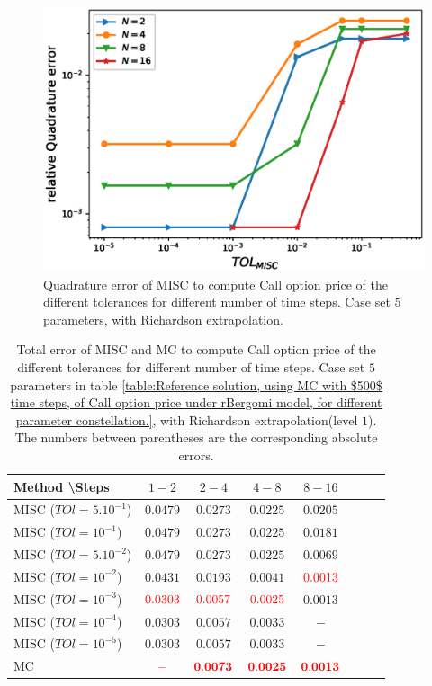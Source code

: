 \documentclass[11pt]{article}
\begin{document}
\begin{figure}[h!]
	\centering
	\includegraphics[width=0.7\linewidth]{./figures/rBergomi_MISC_quadratre_error/vs_TOL/set5/relative_quad_error_wrt_MISC_TOL_set5_with_rich}
	
	
	\caption{Quadrature error of MISC to compute Call option price of the different tolerances for different number of time steps. Case  set $5$ parameters, with Richardson extrapolation.}
	\label{fig:Quadrature_error_set5_rich}
\end{figure}

\begin{table}[h!]
	\centering
	\begin{tabular}{l*{6}{c}r}
		Method \textbackslash  Steps            & $1-2$ & $2-4$ & $4-8$ & $8-16$  \\
		\hline
		MISC ($TOl=5.10^{-1}$)  & $0.0479$ & $0.0273$  & $0.0225$ & $0.0205$  \\
		MISC ($TOl=10^{-1}$)   & $0.0479$  &$0.0273$  &$0.0225$ & $0.0181$  \\
		MISC ($TOl=5.10^{-2}$)  &  $0.0479$ & $0.0273$  &$0.0225$ & $0.0069$  \\
			MISC ($TOl=10^{-2}$)  &  $0.0431$ & $0.0193$  & $0.0041$ & ${\color{red}0.0013}$  \\
		MISC ($TOl=10^{-3}$)  & ${\color{red}0.0303}$ & ${\color{red}0.0057}$  & ${\color{red}0.0025}$ & $0.0013$  \\
		MISC ($TOl=10^{-4}$)   & $0.0303$ &$0.0057$  & $0.0033$  & $-$  \\
			MISC ($TOl=10^{-5}$)    &  $0.0303$ &$0.0057$   &  $0.0033$ & $-$  \\	
	\hline

		MC  & ${\color{red}\mathbf{-}}$  & ${\color{red}\mathbf{0.0073}}$  &   ${\color{red}\mathbf{0.0025}}$  &  ${\color{red}\mathbf{0.0013}}$  \\
		\hline
	\end{tabular}
	\caption{Total  error of MISC and MC to compute Call option price of the different tolerances for different number of time steps. Case set $5$ parameters in table \ref{table:Reference solution, using MC with $500$ time steps, of Call option price under rBergomi model, for different parameter constellation.}, with Richardson extrapolation(level $1$). The numbers between parentheses are the corresponding absolute errors.}
	\label{Total  error of MISC and MC to compute Call option price of the different tolerances for different number of time steps. Case set $5$ parameters, with Richardson extrapolation(level $1$). The numbers between parentheses are the corresponding absolute errors.}
\end{table}
\end{document}
